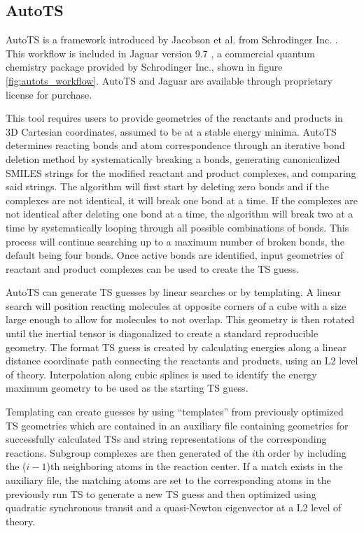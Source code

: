 \documentclass[preprint, 11pt]{elsarticle} %
\begin{document}
\subsection{AutoTS}

AutoTS is a framework introduced by Jacobson et al. from Schrodinger Inc. \cite{jacobson:2017}. 
This workflow is included in Jaguar version 9.7 \cite{Jaguar:2013}, a commercial quantum chemistry package provided by Schrodinger Inc., shown in figure \ref{fig:autots_workflow}.
AutoTS and Jaguar are available through proprietary license for purchase.

This tool requires users to provide geometries of the reactants and products in 3D Cartesian coordinates, assumed to be at a stable energy minima.
AutoTS determines reacting bonds and atom correspondence through an iterative bond deletion method by systematically breaking a bonds, generating canonicalized SMILES strings for the modified reactant and product complexes, and comparing said strings.
The algorithm will first start by deleting zero bonds and if the complexes are not identical, it will break one bond at a time.
If the complexes are not identical after deleting one bond at a time, the algorithm will break two at a time by systematically looping through all possible combinations of bonds.
This process will continue searching up to a maximum number of broken bonds, the default being four bonds.
Once active bonds are identified, input geometries of reactant and product complexes can be used to create the TS guess.

AutoTS can generate TS guesses by linear searches or by templating. 
A linear search will position reacting molecules at opposite corners of a cube with a size large enough to allow for molecules to not overlap.
This geometry is then rotated until the inertial tensor is diagonalized to create a standard reproducible geometry.
The format TS guess is created by calculating energies along a linear distance coordinate path connecting the reactants and products, using an L2 level of theory.
Interpolation along cubic splines is used to identify the energy maximum geometry to be used as the starting TS guess.

Templating can create guesses by using ``templates''  from previously optimized TS geometries which are contained in an auxiliary file containing geometries for successfully calculated TSs and string representations of the corresponding reactions.
Subgroup complexes are then generated of the $i$th order by including the ($i-1$)th neighboring atoms in the reaction center. 
If a match exists in the auxiliary file, the matching atoms are set to the corresponding atoms in the previously run TS to generate a new TS guess and  then optimized using quadratic synchronous transit and a quasi-Newton eigenvector at a L2 level of theory.
\end{document}
